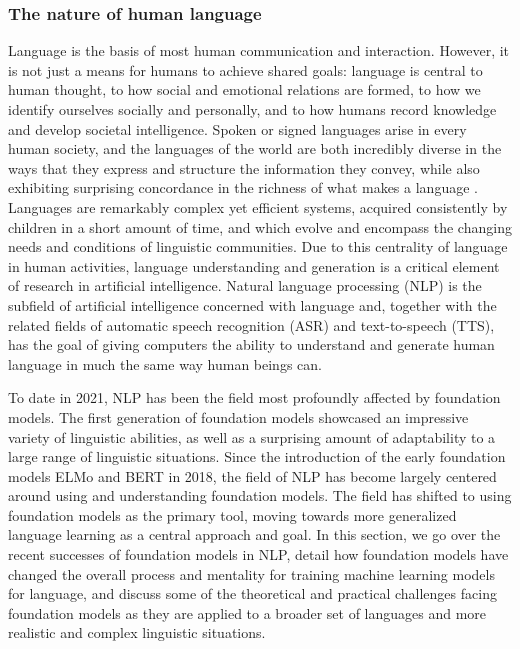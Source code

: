 \subsubsection{The nature of human language}

Language is the basis of most human communication and interaction. However, it is not just a means for humans to achieve shared goals: language is central to human thought, to how social and emotional relations are formed, to how we identify ourselves socially and personally, and to how humans record knowledge and develop societal intelligence. Spoken or signed languages arise in every human society, and the languages of the world are both incredibly diverse in the ways that they express and structure the information they convey, while also exhibiting surprising concordance in the richness of what makes a language \citep{comrie1989language}. Languages are remarkably complex yet efficient systems, acquired consistently by children in a short amount of time, and which evolve and encompass the changing needs and conditions of linguistic communities. Due to this centrality of language in human activities, language understanding and generation is a critical element of research in artificial intelligence. Natural language processing (NLP) is the subfield of artificial intelligence concerned with language and, together with the related fields of automatic speech recognition (ASR) and text-to-speech (TTS), has the goal of giving computers the ability to understand and generate human language in much the same way human beings can. 

To date in 2021, NLP has been the field most profoundly affected by foundation models. The first generation of foundation models showcased an impressive variety of linguistic abilities, as well as a surprising amount of adaptability to a large range of linguistic situations. Since the introduction of the early foundation models ELMo \cite{peters2018elmo} and BERT \cite{devlin2019bert} in 2018, the field of NLP has become largely centered around using and understanding foundation models. The field has shifted to using foundation models as the primary tool, moving towards more generalized language learning as a central approach and goal. In this section, we go over the recent successes of foundation models in NLP, detail how foundation models have changed the overall process and mentality for training machine learning models for language, and discuss some of the theoretical and practical challenges facing foundation models as they are applied to a broader set of languages and more realistic and complex linguistic situations.

